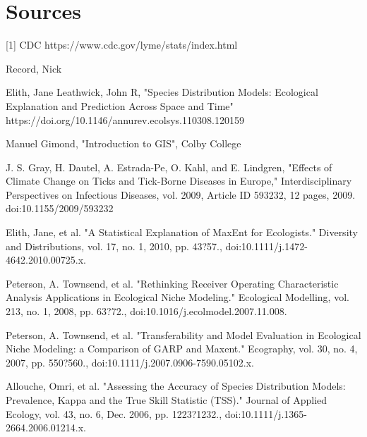 
\chapter{Sources} %
[1] CDC https://www.cdc.gov/lyme/stats/index.html \newline

\noindent [2] Record, Nick \newline

\noindent [3] Elith, Jane Leathwick, John R,
"Species Distribution Models: Ecological Explanation and Prediction Across Space and Time" \newline
https://doi.org/10.1146/annurev.ecolsys.110308.120159\newline

\noindent [4] Manuel Gimond, "Introduction to GIS", Colby College \newline

\noindent [5] J. S. Gray, H. Dautel, A. Estrada-Pe, O. Kahl, and E. Lindgren, 
"Effects of Climate Change on Ticks and Tick-Borne Diseases in Europe,"
Interdisciplinary Perspectives on Infectious Diseases, vol. 2009, Article ID 593232,
12 pages, 2009. doi:10.1155/2009/593232\newline

\noindent [6] Elith, Jane, et al. "A Statistical Explanation of MaxEnt for Ecologists." Diversity and Distributions, 
vol. 17, no. 1, 2010, pp. 43?57., doi:10.1111/j.1472-4642.2010.00725.x.\newline

\noindent [7] Peterson, A. Townsend, et al.
"Rethinking Receiver Operating Characteristic Analysis Applications in Ecological Niche Modeling."
Ecological Modelling, vol. 213, no. 1, 2008, pp. 63?72., doi:10.1016/j.ecolmodel.2007.11.008. \newline

\noindent [8] Peterson, A. Townsend, et al. 
"Transferability and Model Evaluation in Ecological Niche Modeling: a Comparison of GARP and Maxent."
Ecography, vol. 30, no. 4, 2007, pp. 550?560.,
doi:10.1111/j.2007.0906-7590.05102.x.\newline

\noindent [9] Allouche, Omri, et al. 
"Assessing the Accuracy of Species Distribution Models: Prevalence, Kappa and the True Skill Statistic (TSS)." 
Journal of Applied Ecology, vol. 43, no. 6, Dec. 2006, pp. 1223?1232., 
doi:10.1111/j.1365-2664.2006.01214.x. \newline

